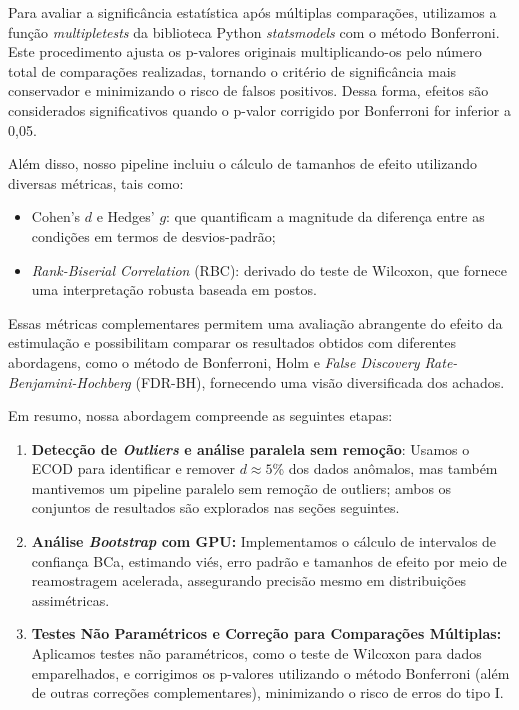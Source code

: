 Para avaliar a significância estatística após múltiplas comparações, utilizamos a função \textit{multipletests} da biblioteca Python \textit{statsmodels} com o método Bonferroni. Este procedimento ajusta os p-valores originais multiplicando-os pelo número total de comparações realizadas, tornando o critério de significância mais conservador e minimizando o risco de falsos positivos. Dessa forma, efeitos são considerados significativos quando o p-valor corrigido por Bonferroni for inferior a 0,05.

Além disso, nosso pipeline incluiu o cálculo de tamanhos de efeito utilizando diversas métricas, tais como:
\begin{itemize}
    \item Cohen's \(d\) e Hedges' \(g\): que quantificam a magnitude da diferença entre as condições em termos de desvios-padrão;
    \item \textit{Rank-Biserial Correlation} (RBC): derivado do teste de Wilcoxon, que fornece uma interpretação robusta baseada em postos.
\end{itemize}

Essas métricas complementares permitem uma avaliação abrangente do efeito da estimulação e possibilitam comparar os resultados obtidos com diferentes abordagens, como o método de Bonferroni, Holm e \textit{False Discovery Rate-Benjamini-Hochberg} (FDR-BH), fornecendo uma visão diversificada dos achados.

Em resumo, nossa abordagem compreende as seguintes etapas:
\begin{enumerate}
    \item \textbf{Detecção de \textit{Outliers} e análise paralela sem remoção}: Usamos o ECOD para identificar e remover \(d\approx5\)\%  dos dados anômalos, mas também mantivemos um pipeline paralelo sem remoção de outliers; ambos os conjuntos de resultados são explorados nas seções seguintes.
    \item \textbf{Análise \textit{Bootstrap} com GPU:} Implementamos o cálculo de intervalos de confiança BCa, estimando viés, erro padrão e tamanhos de efeito por meio de reamostragem acelerada, assegurando precisão mesmo em distribuições assimétricas.
    \item \textbf{Testes Não Paramétricos e Correção para Comparações Múltiplas:} Aplicamos testes não paramétricos, como o teste de Wilcoxon para dados emparelhados, e corrigimos os p-valores utilizando o método Bonferroni (além de outras correções complementares), minimizando o risco de erros do tipo I.
\end{enumerate}

